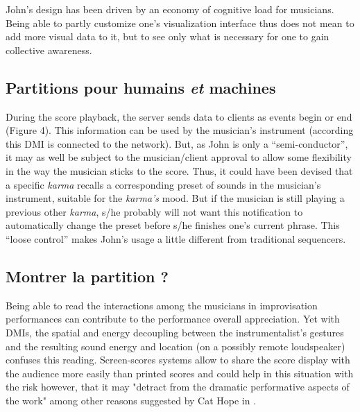John's design has been driven by an economy of cognitive load for musicians. Being able to partly customize one's visualization interface thus does not mean to add more visual data to it, but to see only what is necessary for one to gain collective awareness.

\subsection{Partitions pour humains \emph{et} machines}
\label{sec:notation:score_for_humans_and_machines}

During the score playback, the server sends data to clients as events begin or end (Figure 4). This information can be used by the musician's instrument (according this \gls{DMI} is connected to the network). But, as John is only a “semi-conductor”, it may as well be subject to the musician/client approval to allow some flexibility in the way the musician sticks to the score. Thus, it could have been devised that a specific \textit{karma} recalls a corresponding preset of sounds in the musician's instrument, suitable for the \textit{karma's} mood. But if the musician is still playing a previous other \textit{karma}, s/he probably will not want this notification to automatically change the preset before s/he finishes one's current phrase. This “loose control” makes John's usage a little different from traditional sequencers.

\subsection{Montrer la partition ?}

Being able to read the interactions among the musicians in improvisation performances can contribute to the performance overall appreciation. Yet with \glspl{DMI}, the spatial and energy decoupling between the instrumentalist's gestures and the resulting sound energy and location (on a possibly remote loudspeaker) confuses this reading. Screen-scores systems allow to share the score display with the audience more easily than printed scores and could help in this situation with the risk however, that it may "detract from the dramatic performative aspects of the work" among other reasons suggested by Cat Hope in \cite{hope_screen_2011}. 


